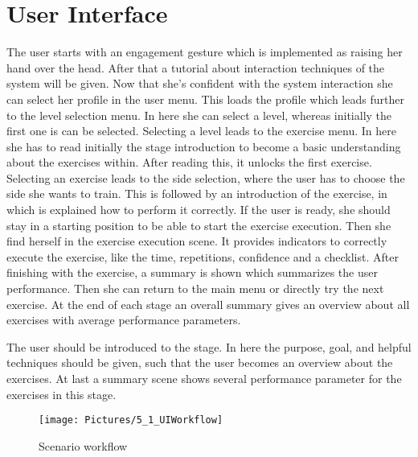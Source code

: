 \section{User Interface}\label{5_4_userInterface}
The user starts with an engagement gesture which is implemented as raising her hand over the head. After that a tutorial about interaction techniques of the system will be given. Now that she's confident with the system interaction she can select her profile in the user menu. This loads the profile which leads further to the level selection menu. In here she can select a level, whereas initially the first one is can be selected. Selecting a level leads to the exercise menu. In here she has to read initially the stage introduction to become a basic understanding about the exercises within. After reading this, it unlocks the first exercise. Selecting an exercise leads to the side selection, where the user has to choose the side she wants to train. This is followed by an introduction of the exercise, in which is explained how to perform it correctly. If the user is ready, she should stay in a starting position to be able to start the exercise execution. Then she find herself in the exercise execution scene. It provides indicators to correctly execute the exercise, like the time, repetitions, confidence and a checklist. After finishing with the exercise, a summary is shown which summarizes the user performance. Then she can return to the main menu or directly try the next exercise. At the end of each stage an overall summary gives an overview about all exercises with average performance parameters.

The user should be introduced to the stage. In here the purpose, goal, and helpful techniques should be given, such that the user becomes an overview about the exercises. At last a summary scene shows several performance parameter for the exercises in this stage.

\begin{figure}[htb]
	\centering
	\begin{minipage}[t]{1\linewidth}
		\centering
		\texttt{[image: Pictures/5\_1\_UIWorkflow]}
		\caption{Scenario workflow}
		\label{fig:scenarioWorkflow}
	\end{minipage}
\end{figure}
